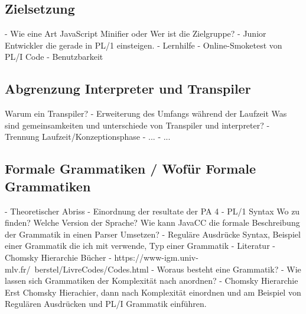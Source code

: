 
% 	 
%	 
%
    
	\subsection{Zielsetzung}
 - Wie eine Art JavaScript Minifier oder 
    Wer ist die Zielgruppe?
    - Junior Entwickler die gerade in PL/1 einsteigen.
    - Lernhilfe
    - Online-Smoketest von PL/I Code
    - Benutzbarkeit
    
	\subsection{Abgrenzung Interpreter und Transpiler}
    Warum ein Transpiler?
    - Erweiterung des Umfangs während der Laufzeit
    Was sind gemeinsamkeiten und unterschiede von Transpiler und interpreter?
    - Trennung Laufzeit/Konzeptionsphase
    - ...
    - ...
    
	\subsection{Formale Grammatiken / Wofür Formale Grammatiken}
     - Theoretischer Abriss
    - Einordnung der resultate der PA 4
	- PL/1 Syntax Wo zu finden? Welche Version der Sprache? 
     Wie kann JavaCC die formale Beschreibung der Grammatik in einen Parser Umsetzen?
	- Reguläre Ausdrücke Syntax, Beispiel einer Grammatik die ich mit verwende, Typ einer Grammatik
    - Literatur
	    - Chomsky Hierarchie Bücher
	    - https://www-igm.univ-mlv.fr/~berstel/LivreCodes/Codes.html
     - Woraus besteht eine Grammatik?
     - Wie lassen sich Grammatiken der Komplexität nach anordnen?
     - Chomsky Hierarchie
     Erst Chomsky Hierachier, dann nach Komplexität einordnen und am Beispiel von Regulären Ausdrücken und PL/I Grammatik einführen.
     
